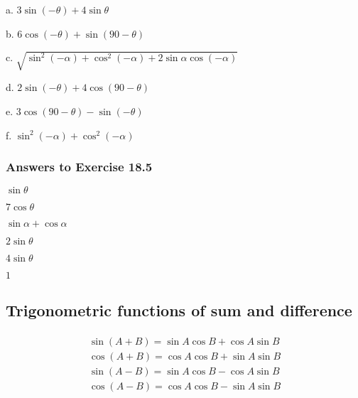\documentclass{article}
\begin{document}
\begin{enumerate}
        \begin{paracol}{2}
          \item[a.] $3\sin(-\theta)+4\sin\theta$
          \item[b.] $6\cos(-\theta)+\sin(90-\theta)$
          \item[c.] $\sqrt{\sin^{2}(-\alpha) + \cos^{2}(-\alpha) + 2\sin\alpha\cos(-\alpha)}$
          \switchcolumn
          \item[d.]$2\sin(-\theta)+4\cos(90-\theta)$
          \item[e.]$3\cos(90-\theta)-\sin(-\theta)$
          \item[f.]$\sin^{2}(-\alpha)+\cos^{2}(-\alpha)$
        \end{paracol}
\end{enumerate}

\subsubsection {Answers to Exercise 18.5}

\begin{enumerate*}[label=\alph*)]
  \item $\sin\theta$
  \item $7\cos\theta$
  \item $\sin\alpha + \cos\alpha$
  \item $2\sin\theta$
  \item $4\sin\theta$
  \item $1$
\end{enumerate*}

\subsection {Trigonometric functions of sum and difference}

\paragraph{}

\[
  \begin{aligned}
    \sin(A+B) = \sin A \cos B + \cos A \sin B \\
    \cos(A+B) = \cos A \cos B + \sin A \sin B \\
    \sin(A-B) = \sin A \cos B - \cos A \sin B \\
    \cos(A-B) = \cos A \cos B - \sin A \sin B
  \end{aligned}
\]
\end{document}
